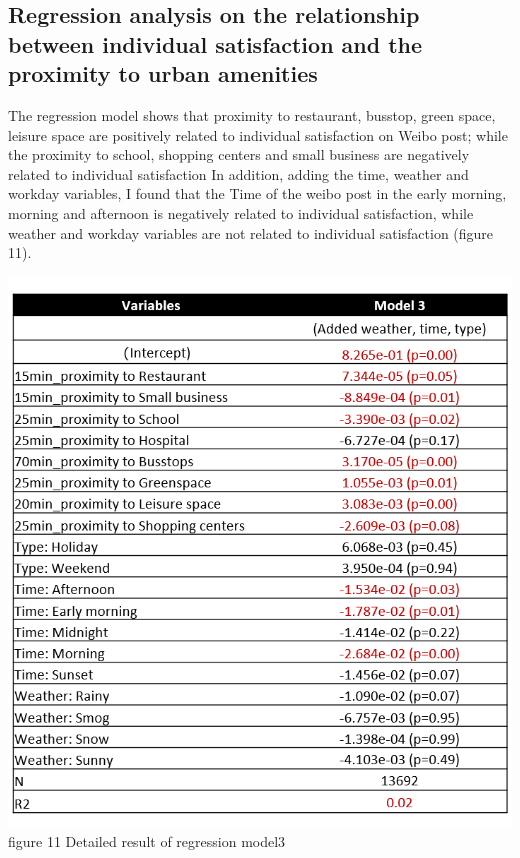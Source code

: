 \documentclass[
]{article}
\begin{document}
\hypertarget{regression-analysis-on-the-relationship-between-individual-satisfaction-and-the-proximity-to-urban-amenities}{%
\subsection{Regression analysis on the relationship between individual
satisfaction and the proximity to urban
amenities}\label{regression-analysis-on-the-relationship-between-individual-satisfaction-and-the-proximity-to-urban-amenities}}

The regression model shows that proximity to restaurant, busstop, green
space, leisure space are positively related to individual satisfaction
on Weibo post; while the proximity to school, shopping centers and small
business are negatively related to individual satisfaction In addition,
adding the time, weather and workday variables, I found that the Time of
the weibo post in the early morning, morning and afternoon is negatively
related to individual satisfaction, while weather and workday variables
are not related to individual satisfaction (figure 11).

\href{https://WTHSYZW.github.io/Thesis_2022/maps/regression1.png}{\includegraphics{maps/regression1.png}}\\
figure 11 Detailed result of regression model3
\end{document}
